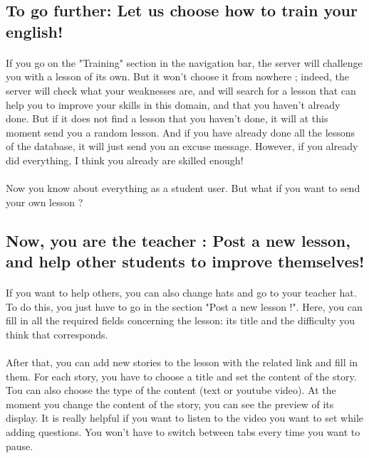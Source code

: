 \subsection{To go further: Let us choose how to train your english!}

\paragraph{}
If you go on the "Training" section in the navigation bar, the server will challenge you with a lesson of its own. But it won't choose it from nowhere ; indeed, the server will check what your weaknesses are, and will search for a lesson that can help you to improve your skills in this domain, and that you haven't already done.\linebreak
But if it does not find a lesson that you haven't done, it will at this moment send you a random lesson. And if you have already done all the lessons of the database, it will just send you an excuse message. However, if you already did everything, I think you already are skilled enough!

\paragraph{}
Now you know about everything as a student user. But what if you want to send your own lesson ?

\subsection{Now, you are the teacher : Post a new lesson, and help other students to improve themselves!}

\paragraph{}
If you want to help others, you can also change hats and go to your teacher hat. To do this, you just have to go in the section "Post a new lesson !". Here, you can fill in all the required fields concerning the lesson: its title and the difficulty you think that corresponds. 

\paragraph{}
After that, you can add new stories to the lesson with the related link and fill in them. For each story, you have to choose a title and set the content of the story. Tou can also choose the type of the content (text or youtube video). At the moment you change the content of the story, you can see the preview of its display. It is really helpful if you want to listen to the video you want to set while adding questions. You won't have to switch between tabs every time you want to pause.

